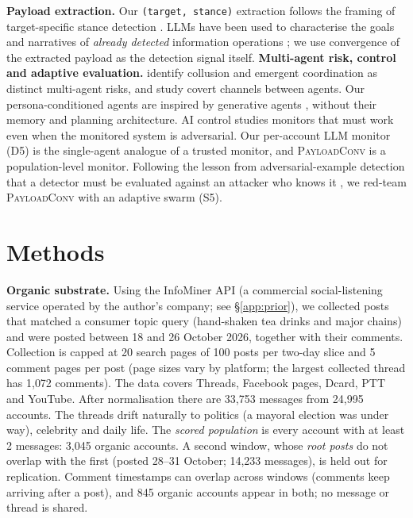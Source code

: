 \documentclass[10pt]{article}
\newcommand{\ours}{\textsc{PayloadConv}}
\begin{document}
\textbf{Payload extraction.} Our \texttt{(target, stance)} extraction follows the framing of target-specific stance detection \citep{kucuk2020stance}. LLMs have been used to characterise the goals and narratives of \emph{already detected} information operations \citep{burghardt2024llmio}; we use convergence of the extracted payload as the detection signal itself.
\textbf{Multi-agent risk, control and adaptive evaluation.} \citet{hammond2025multiagent} identify collusion and emergent coordination as distinct multi-agent risks, and \citet{motwani2024secret} study covert channels between agents. Our persona-conditioned agents are inspired by generative agents \citep{park2023generative}, without their memory and planning architecture. AI control \citep{greenblatt2024control} studies monitors that must work even when the monitored system is adversarial. Our per-account LLM monitor (D5) is the single-agent analogue of a trusted monitor, and \ours{} is a population-level monitor. Following the lesson from adversarial-example detection that a detector must be evaluated against an attacker who knows it \citep{carlini2017,tramer2020adaptive}, we red-team \ours{} with an adaptive swarm (S5).

\section{Methods}\label{sec:method}
\textbf{Organic substrate.} Using the InfoMiner API (a commercial social-listening service operated by the author's company; see \S\ref{app:prior}), we collected posts that matched a consumer topic query (hand-shaken tea drinks and major chains) and were posted between 18 and 26 October 2026, together with their comments. Collection is capped at 20 search pages of 100 posts per two-day slice and 5 comment pages per post (page sizes vary by platform; the largest collected thread has 1{,}072 comments). The data covers Threads, Facebook pages, Dcard, PTT and YouTube.
After normalisation there are 33{,}753 messages from 24{,}995 accounts. The threads drift naturally to politics (a mayoral election was under way), celebrity and daily life.
The \emph{scored population} is every account with at least 2 messages: 3{,}045 organic accounts. A second window, whose \emph{root posts} do not overlap with the first (posted 28--31 October; 14{,}233 messages), is held out for replication. Comment timestamps can overlap across windows (comments keep arriving after a post), and 845 organic accounts appear in both; no message or thread is shared.
\end{document}
